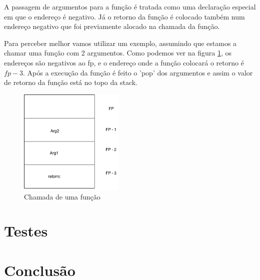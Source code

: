 \documentclass[a4paper,10pt]{report}
\begin{document}
A passagem de argumentos para a função é tratada como uma declaração especial em que o endereço é negativo.
Já o retorno da função é colocado também num endereço negativo que foi previamente alocado na chamada da função.

Para perceber melhor vamos utilizar um exemplo, assumindo que estamos a chamar uma função com 2 argumentos.
Como podemos ver na figura \ref{fig:functionStack}, os endereços são negativos ao fp, e o endereço onde a função colocará o retorno é $fp - 3$.
Após a execução da função é feito o 'pop' dos argumentos e assim o valor de retorno da função está no topo da stack. 

\begin{figure}
\centering
\includegraphics[width=5cm]{functionStack.png}
\caption{Chamada de uma função}
\label{fig:functionStack}
\end{figure}

\chapter{Testes}


\chapter{Conclusão}
\label{cap:intro}




\end{document}

